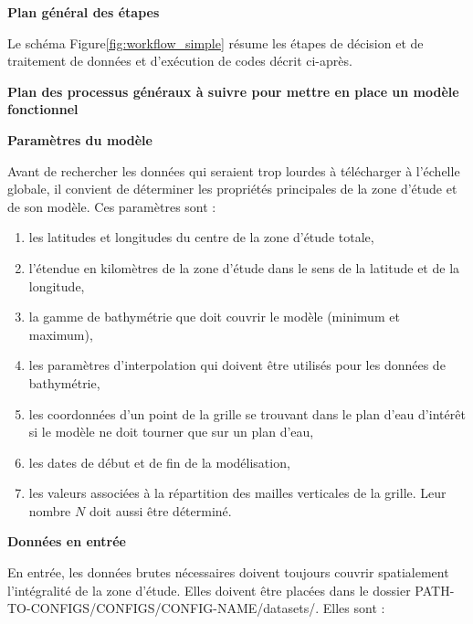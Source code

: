\documentclass[10pt,a4paper,titlepage]{article}
\begin{document}
    \textbf{Plan général des étapes}
    
    
    
    Le schéma Figure\ref{fig:workflow_simple} résume les étapes de décision et de traitement de données et d'exécution de codes décrit ci-après.
    
    \begin{processEnv}{\textbf{Plan des processus généraux à suivre pour mettre en place un modèle fonctionnel}}
        
        {\color{paramColor}\textbf{Paramètres du modèle}}
        
        Avant de rechercher les données qui seraient trop lourdes à télécharger à l'échelle globale, il convient de déterminer les propriétés principales de la zone d'étude et de son modèle. Ces paramètres sont :
        
        \begin{enumerate}
            \item les latitudes et longitudes du centre de la zone d'étude totale,
            \item l'étendue en kilomètres de la zone d'étude dans le sens de la latitude et de la longitude,
            \item la gamme de bathymétrie que doit couvrir le modèle (minimum et maximum),
            \item les paramètres d'interpolation qui doivent être utilisés pour les données de bathymétrie,
            \item les coordonnées d'un point de la grille se trouvant dans le plan d'eau d'intérêt si le modèle ne doit tourner que sur un plan d'eau,
            \item les dates de début et de fin de la modélisation,
            \item les valeurs associées à la répartition des mailles verticales de la grille. Leur nombre $N$ doit aussi être déterminé.
        \end{enumerate}
        
        
        {\color{dataColor}\textbf{Données en entrée}}
        
        En entrée, les données brutes nécessaires doivent toujours couvrir spatialement l'intégralité de la zone d'étude. Elles doivent être placées dans le dossier PATH-TO-CONFIGS/CONFIGS/CONFIG-NAME/datasets/.
        Elles sont :
        

\end{processEnv}
\end{document}
